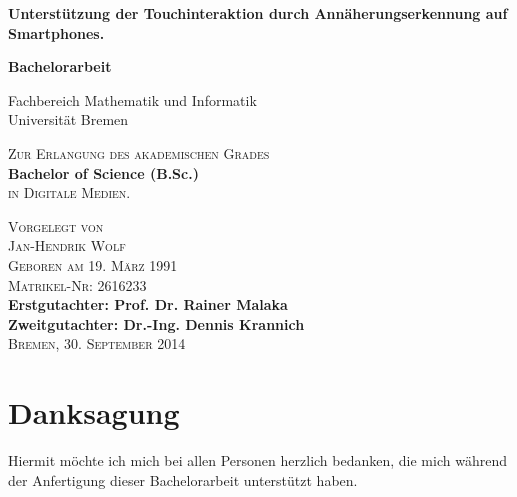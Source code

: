 \documentclass[12pt,bibliography=totocnumbered,listof=totocnumbered,abstracton]{scrreprt}
\begin{document}
\pagestyle{empty}
\begin{titlepage}
\begin{center}
\null
\vfill
\LARGE\textsf{\textbf{Unterstützung der Touchinteraktion durch Annäherungserkennung auf Smartphones.}}

\vfill
\LARGE\textrm{\textbf{Bachelorarbeit}}

\large\textrm{Fachbereich Mathematik und Informatik\\
\vspace{.5em}
Universität Bremen}

\vfill
\large\textsc{Zur Erlangung des akademischen Grades}\\
\vspace{.75em}
\textbf{Bachelor of Science (B.Sc.)}\\
\vspace{.75em}
\textsc{in Digitale Medien.}

\vfill\small\textsc{
Vorgelegt von\\
Jan-Hendrik Wolf\\
Geboren am 19. März 1991\\
Matrikel-Nr: 2616233}\\
\vspace{1cm}
\small\textbf{Erstgutachter:  Prof. Dr. Rainer Malaka\\
Zweitgutachter: Dr.-Ing. Dennis Krannich}\\
\vspace{1cm}
\small\textsc{Bremen, 30. September 2014}
\end{center}
\end{titlepage}

\tableofcontents

\chapter*{Danksagung}
Hiermit möchte ich mich bei allen Personen herzlich bedanken, die mich während der Anfertigung dieser Bachelorarbeit unterstützt haben.
\end{document}
